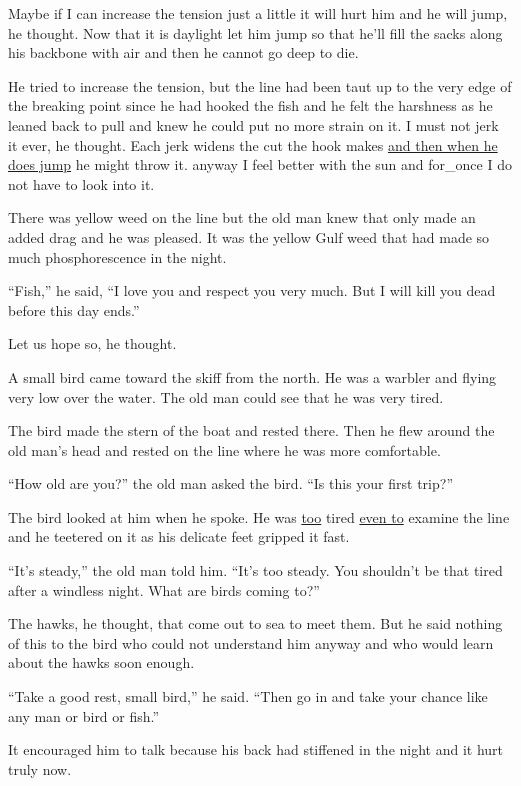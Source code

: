 \documentclass[fontset=ubuntu,zihao=-4]{ctexrep}
\begin{document}
Maybe if I can increase the tension just a little it will hurt him and he
will jump, he thought. Now that it is daylight let him jump so that he'll
fill the sacks along his \gls{backbone} with air and then he cannot go deep to
die.

He tried to increase the tension, but the line had been taut up to the very
edge of the breaking point since he had hooked the fish and he felt the
\gls{harshness} as he leaned back to pull and knew he could put no more
strain on it. I must not jerk it ever, he thought. Each jerk \glspl{widen}
the cut the hook makes \uline{and then when he does jump} he might throw it.
\Gls{anyway} I feel better with the sun and \gls{for_once} I do not have to look
into it.

There was yellow weed on the line but the old man knew that only made an
added \gls{drag} and he was pleased. It was the yellow Gulf weed that had
made so much phosphorescence in the night.

``Fish,'' he said, ``I love you and respect you very much. But I will kill
you dead before this day ends.''

Let us hope so, he thought.

A small bird came toward the skiff from the north. He was a \gls{warbler} and
flying very low over the water. The old man could see that he was very
tired.

The bird made the stern of the boat and rested there. Then he flew
around the old man's head and rested on the line where he was more
comfortable.

``How old are you?'' the old man asked the bird. ``Is this your first trip?''

The bird looked at him when he spoke. He was \uline{too} tired \uline{even
  to} examine the line and he \gls{teetered} on it as his delicate feet
\gls{gripped} it fast.

``It's steady,'' the old man told him. ``It's too steady. You shouldn't be
that tired after a windless night. What are birds coming to?''

The \glspl{hawk}, he thought, that come out to sea to meet them. But he said
nothing of this to the bird who could not understand him anyway and who
would learn about the hawks soon enough.

``Take a good rest, small bird,'' he said. ``Then go in and take your chance
like any man or bird or fish.''

It \gls{encouraged} him to talk because his back had \gls{stiffened} in the
night and it hurt truly now.
\end{document}
